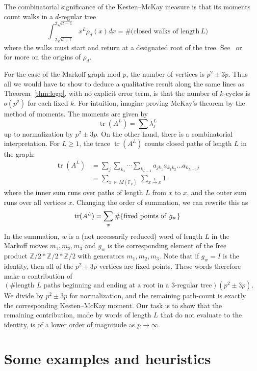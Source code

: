 \documentclass[AHL, Unicode, longabstracts, published]{cedram}
\newcommand{\Z}{\mathbb{Z}}
\newcommand{\F}{\mathbb{F}}
\DeclareMathOperator{\tr}{tr}
\newcommand{\Z}{\mathbb{Z}}
\begin{document}
The combinatorial significance of the Kesten--McKay measure is that its moments count walks in a $d$-regular tree
\[
\int_{-2\sqrt{d-1}}^{2\sqrt{d-1}} x^L \rho_d(x) dx = \#\big(\text{closed walks of length} \ L \big)
\]
where the walks must start and return at a designated root of the tree. See~\cite[p.~205--213]{M} or~\cite[p.~14]{K} for more on the origins of $\rho_d$.

For the case of the Markoff graph mod $p$, the number of vertices is $p^2 \pm 3p$. Thus all we would have to show to deduce a qualitative result along the same lines as Theorem~\ref{thm:logp}, with no explicit error term, is that the number of $k$-cycles is $o(p^2)$ for each fixed $k$. For intuition, imagine proving McKay's theorem by the method of moments. The moments are given by
\[
\tr(A^L) = \sum \lambda_j^L
\]
up to normalization by $p^2 \pm 3p$. On the other hand, there is a combinatorial interpretation. For $L \geq 1$, the trace $\tr(A^L)$ counts closed paths of length $L$ in the graph:
\begin{align*}
\tr(A^L) &= \sum_{j} \sum_{k_1} \cdots \sum_{k_{L-1}} a_{jk_1}a_{k_1k_2} \ldots a_{k_{L-1} j} \\
&= \sum_{x\,\in\,M(\F_p)}\,\sum_{x \overset{L}{\rightarrow} x } 1
\end{align*}
where the inner sum runs over paths of length $L$ from $x$ to $x$, and the outer sum runs over all vertices $x$. Changing the order of summation, we can rewrite this as
\[
\tr(A^L) = \sum_w \#\{ {\rm fixed \ points \ of \ } g_w \}
\]
In the summation, $w$ is a (not necessarily reduced) word of length $L$ in the Markoff moves $m_1, m_2, m_3$ and $g_w$ is the corresponding element of the free product $\Z/2 * \Z/2 * \Z/2$ with generators $m_1, m_2, m_3$. Note that if $g_w = I$ is the identity, then all of the $p^2 \pm 3p$ vertices are fixed points. These words therefore make a contribution of
\[
(\#\text{length $L$ paths beginning and ending at a root in a $3$-regular tree})(p^2 \pm 3p).
\]
We divide by $p^2 \pm 3p$ for normalization, and the remaining path-count is exactly the corresponding Kesten--McKay moment. Our task is to show that the remaining contribution, made by words of length $L$ that do not evaluate to the identity, is of a lower order of magnitude as $p \rightarrow \infty$.

\section{Some examples and heuristics} \label{sec:examples}
\end{document}
